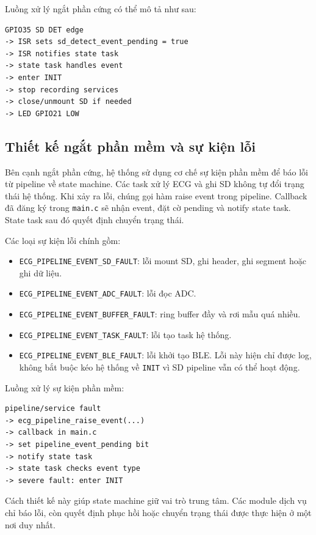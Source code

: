 Luồng xử lý ngắt phần cứng có thể mô tả như sau:

\begin{verbatim}
GPIO35 SD DET edge
-> ISR sets sd_detect_event_pending = true
-> ISR notifies state task
-> state task handles event
-> enter INIT
-> stop recording services
-> close/unmount SD if needed
-> LED GPIO21 LOW
\end{verbatim}

\subsection{Thiết kế ngắt phần mềm và sự kiện lỗi}

Bên cạnh ngắt phần cứng, hệ thống sử dụng cơ chế sự kiện phần mềm để báo lỗi từ
pipeline về state machine. Các task xử lý ECG và ghi SD không tự đổi trạng thái
hệ thống. Khi xảy ra lỗi, chúng gọi hàm raise event trong pipeline. Callback đã
đăng ký trong \texttt{main.c} sẽ nhận event, đặt cờ pending và notify state
task. State task sau đó quyết định chuyển trạng thái.

Các loại sự kiện lỗi chính gồm:

\begin{itemize}
    \item \texttt{ECG\_PIPELINE\_EVENT\_SD\_FAULT}: lỗi mount SD, ghi header,
    ghi segment hoặc ghi dữ liệu.
    \item \texttt{ECG\_PIPELINE\_EVENT\_ADC\_FAULT}: lỗi đọc ADC.
    \item \texttt{ECG\_PIPELINE\_EVENT\_BUFFER\_FAULT}: ring buffer đầy và rơi
    mẫu quá nhiều.
    \item \texttt{ECG\_PIPELINE\_EVENT\_TASK\_FAULT}: lỗi tạo task hệ thống.
    \item \texttt{ECG\_PIPELINE\_EVENT\_BLE\_FAULT}: lỗi khởi tạo BLE. Lỗi này
    hiện chỉ được log, không bắt buộc kéo hệ thống về \texttt{INIT} vì SD
    pipeline vẫn có thể hoạt động.
\end{itemize}

Luồng xử lý sự kiện phần mềm:

\begin{verbatim}
pipeline/service fault
-> ecg_pipeline_raise_event(...)
-> callback in main.c
-> set pipeline_event_pending bit
-> notify state task
-> state task checks event type
-> severe fault: enter INIT
\end{verbatim}

Cách thiết kế này giúp state machine giữ vai trò trung tâm. Các module dịch vụ
chỉ báo lỗi, còn quyết định phục hồi hoặc chuyển trạng thái được thực hiện ở
một nơi duy nhất.

